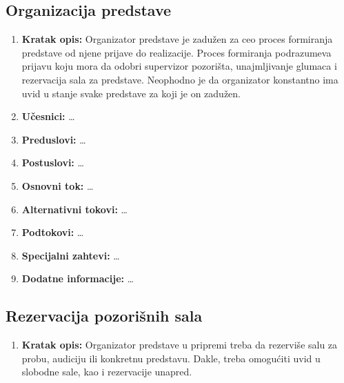 \documentclass[a4paper]{article}
\begin{document}
\subsection{Organizacija predstave}
\begin{enumerate}
  \item \textbf{Kratak opis:} Organizator predstave je zadužen za ceo proces formiranja predstave od njene prijave do realizacije. 
        Proces formiranja podrazumeva prijavu koju mora da odobri supervizor pozorišta, unajmljivanje 
        glumaca i rezervacija sala za predstave. Neophodno je da organizator konstantno ima uvid u stanje
        svake predstave za koji je on zadužen.
  \item \textbf{Učesnici:} \dots
  \item \textbf{Preduslovi:} \dots
  \item \textbf{Postuslovi:} \dots
  \item \textbf{Osnovni tok:} \dots
  \item \textbf{Alternativni tokovi:} \dots
  \item \textbf{Podtokovi:} \dots
  \item \textbf{Specijalni zahtevi:} \dots
  \item \textbf{Dodatne informacije:} \dots
\end{enumerate}

\subsection{Rezervacija pozorišnih sala}
\begin{enumerate}
  \item \textbf{Kratak opis:} Organizator predstave u pripremi treba da rezerviše salu za probu, 
        audiciju ili konkretnu predstavu. Dakle, treba omogućiti uvid u slobodne sale, 
        kao i rezervacije unapred.
\end{enumerate}
\end{document}
